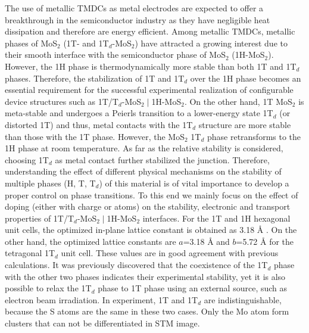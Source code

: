The use of metallic TMDCs as metal electrodes are expected to offer a breakthrough in the semiconductor industry as they have negligible heat dissipation and therefore are energy efficient. Among metallic TMDCs, metallic phases of MoS$_2$ (1T- and 1T$_d$-MoS$_2$) have attracted a growing interest due to their smooth interface with  the semiconductor phase of MoS$_2$ (1H-MoS$_2$). 
However, the 1H phase is thermodynamically more stable than both 1T and 1T$_d$ phases. Therefore, the stabilization of 1T and 1T$_d$  over the 1H phase becomes an essential requirement for the successful experimental realization of configurable device structures such as 1T/T$_d$-MoS$_{2}\mid$1H-MoS$_2$. On the other hand, 1T MoS$_2$ is meta-stable and undergoes a Peierls transition to a lower-energy state 1T$_d$ (or distorted 1T) and thus, metal contacts with the 1T$_d$ structure are more stable than those with the 1T phase. However, the MoS$_2$ 1T$_d$ phase retransforms to the 1H phase at room temperature. 
As far as the relative stability is considered, choosing 1T$_d$ as metal contact further stabilized the junction.
Therefore, understanding the effect of different physical mechanisms on the stability of multiple phases (H, T, T$_d$) of this material is of vital importance to develop a proper control on phase transitions. To this end we mainly focus on the effect of doping (either with charge or atoms) on the stability, electronic and transport properties of 1T/T$_d$-MoS$_2\mid$1H-MoS$_2$ interfaces.  For the 1T and 1H hexagonal unit cells, the optimized in-plane lattice constant is obtained as 3.18 {\AA} .  On the other hand, the optimized lattice constants are $a$=3.18 {\AA}  and  $b$=5.72 {\AA} for  the tetragonal 1T$_d$ unit cell. 
These values are in good agreement with previous calculations\cite{C5NR07715J}. It was previously discovered that the coexistence of the 1T$_d$ phase with the other two phases indicates their experimental stability, yet it is also possible to  relax the 1T$_d$ phase to 1T phase using an external source, such as electron beam irradiation\cite{Eda2012}. 
In experiment, 1T and 1T$_d$ are indistinguishable, because the S atoms are the same in these two cases. Only the Mo atom form clusters that can not be differentiated in STM image.

